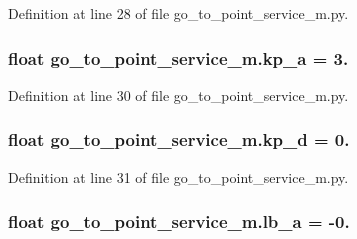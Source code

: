 Definition at line 28 of file go\+\_\+to\+\_\+point\+\_\+service\+\_\+m.\+py.

\subsubsection[{\texorpdfstring{kp\+\_\+a}{kp_a}}]{\setlength{\rightskip}{0pt plus 5cm}float go\+\_\+to\+\_\+point\+\_\+service\+\_\+m.\+kp\+\_\+a = 3.}\hypertarget{namespacego__to__point__service__m_a7e9c758884ac92bbb820e532fd32abf6}{}\label{namespacego__to__point__service__m_a7e9c758884ac92bbb820e532fd32abf6}


Definition at line 30 of file go\+\_\+to\+\_\+point\+\_\+service\+\_\+m.\+py.

\subsubsection[{\texorpdfstring{kp\+\_\+d}{kp_d}}]{\setlength{\rightskip}{0pt plus 5cm}float go\+\_\+to\+\_\+point\+\_\+service\+\_\+m.\+kp\+\_\+d = 0.}\hypertarget{namespacego__to__point__service__m_aa9ffa11cdce18c2942bca64db42cb249}{}\label{namespacego__to__point__service__m_aa9ffa11cdce18c2942bca64db42cb249}


Definition at line 31 of file go\+\_\+to\+\_\+point\+\_\+service\+\_\+m.\+py.

\subsubsection[{\texorpdfstring{lb\+\_\+a}{lb_a}}]{\setlength{\rightskip}{0pt plus 5cm}float go\+\_\+to\+\_\+point\+\_\+service\+\_\+m.\+lb\+\_\+a = -\/0.}\hypertarget{namespacego__to__point__service__m_a66ab9d35823a86f4fee11da3fa6a7157}{}\label{namespacego__to__point__service__m_a66ab9d35823a86f4fee11da3fa6a7157}


